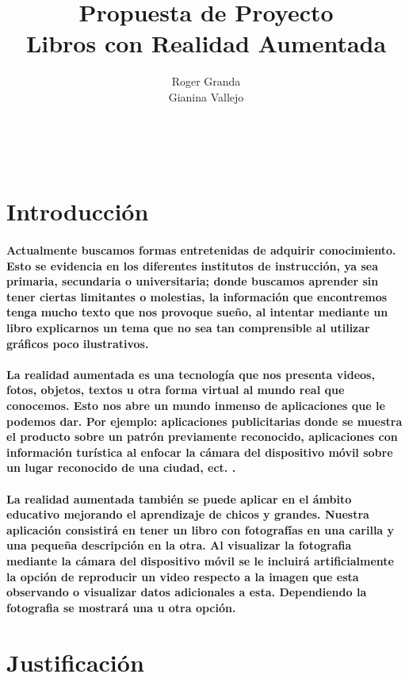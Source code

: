 \documentclass[11pt]{article} %
\title{Propuesta de Proyecto\\Libros con Realidad Aumentada}
\author{Roger Granda\\Gianina Vallejo}
\begin{document}
\maketitle
\

\section{Introducción }

\paragraph{
Actualmente buscamos formas entretenidas de adquirir conocimiento.  Esto se evidencia en los diferentes institutos de instrucción, ya sea primaria, secundaria o universitaria; donde buscamos aprender sin tener ciertas limitantes o molestias, la información que encontremos tenga mucho texto que nos provoque sueño, al intentar mediante un libro explicarnos un tema que no sea tan comprensible al utilizar gráficos poco ilustrativos.
 } 


\paragraph{
La realidad aumentada es una tecnología que nos presenta videos, fotos, objetos, textos u otra forma virtual al mundo real que conocemos.  Esto nos abre un mundo inmenso de aplicaciones que le podemos dar.  Por ejemplo: aplicaciones publicitarias donde se muestra el producto sobre un patrón previamente reconocido, aplicaciones con información turística al enfocar la cámara del dispositivo móvil sobre un lugar reconocido de una ciudad, ect. .
 }

\paragraph{
La realidad aumentada también se puede aplicar en el ámbito educativo mejorando el aprendizaje de chicos y grandes.  
Nuestra aplicación consistirá en tener un libro con fotografías en una carilla y una pequeña descripción en la otra.  Al visualizar la fotografia mediante la cámara del dispositivo móvil se le incluirá artificialmente la opción de reproducir un video respecto a la imagen que esta observando o visualizar datos adicionales a esta.  Dependiendo la fotografia se mostrará una u otra opción.
 }

\section{Justificación}
\end{document}
